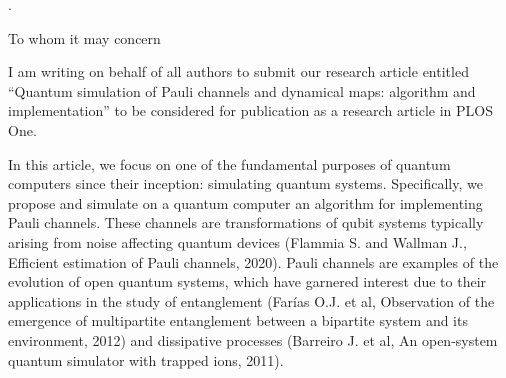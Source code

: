 \documentclass[12pt, addrfooterall, english]{if_letter_2013}
\begin{document}
\begin{letter}{
.\vspace{-2cm}
}
\opening{To whom it may concern}

% 
% 



% 

% 
% 

I am writing on behalf of all authors to submit our research article entitled
“Quantum simulation of Pauli channels and dynamical maps: algorithm and
implementation” to be considered for publication as a research article in PLOS
One. 

In this article, we focus on one of the fundamental purposes of quantum
computers since their inception: simulating quantum systems. Specifically, we
propose and simulate on a quantum computer an algorithm for implementing
Pauli channels. These channels are transformations of qubit systems typically 
arising from noise affecting quantum devices (Flammia S. and Wallman J.,
Efficient estimation of Pauli channels, 2020). Pauli channels are examples of 
the evolution of open quantum systems, which have garnered interest due to 
their applications in the study of entanglement (Farías O.J. et al, 
Observation of the emergence of multipartite entanglement between a bipartite 
system and its environment, 2012) and dissipative processes 
(Barreiro J. et al, An open-system quantum simulator with trapped ions, 2011).


\end{letter}
\end{document}
